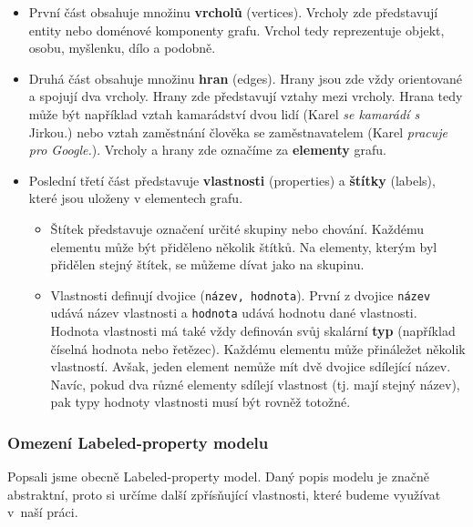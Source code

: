 \begin{itemize}
\item První část obsahuje množinu \textbf{vrcholů} (vertices).
Vrcholy zde představují entity nebo doménové komponenty grafu.
Vrchol tedy reprezentuje objekt, osobu, myšlenku, dílo a podobně.

\item Druhá část obsahuje množinu \textbf{hran} (edges).
Hrany jsou zde vždy orientované a spojují dva vrcholy.
Hrany zde představují vztahy mezi vrcholy.
Hrana tedy může být například vztah kamarádství dvou lidí (Karel \textit{se kamarádí s} Jirkou.) nebo vztah zaměstnání člověka se zaměstnavatelem (Karel \textit{pracuje pro Google.}).
Vrcholy a hrany zde označíme za \textbf{elementy} grafu.
\item Poslední třetí část představuje \textbf{vlastnosti} (properties) a \textbf{štítky} (labels), které jsou uloženy v elementech grafu.

\begin{itemize}
\item
Štítek představuje označení určité skupiny nebo chování.
Každému elementu může být přiděleno několik štítků.
Na elementy, kterým byl přidělen stejný štítek, se můžeme dívat jako na skupinu.

\item
Vlastnosti definují dvojice (\texttt{název, hodnota}).
První z dvojice \texttt{název} udává název vlastnosti a \texttt{hodnota} udává hodnotu dané vlastnosti.
Hodnota vlastnosti má také vždy definován svůj skalární \textbf{typ} (například číselná hodnota nebo řetězec).
Každému elementu může přináležet několik vlastností.
Avšak, jeden element nemůže mít dvě dvojice sdílející název.
Navíc, pokud dva různé elementy sdílejí vlastnost (tj. mají stejný název), pak typy hodnoty vlastnosti musí být rovněž totožné.
\end{itemize}
\end{itemize}

\subsubsection{Omezení Labeled-property modelu}
Popsali jsme obecně Labeled-property model.
Daný popis modelu je značně abstraktní, proto si určíme další zpřísňující vlastnosti, které budeme využívat v~naší práci.

